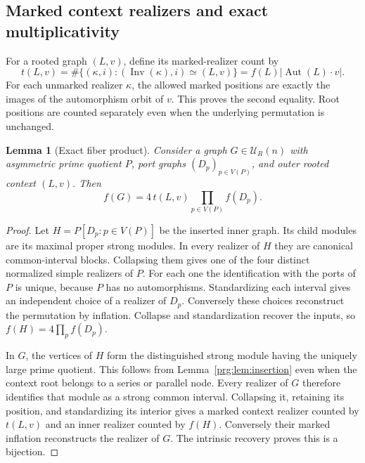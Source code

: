 \documentclass[11pt,letterpaper]{article}
\numberwithin{equation}{section}
\newtheorem{lemma}[theorem]{Lemma}
\theoremstyle{definition}\newtheorem{definition}[theorem]{Definition}
\theoremstyle{remark}\newtheorem{remark}[theorem]{Remark}
\DeclareMathOperator{\Aut}{Aut}
\DeclareMathOperator{\Inv}{Inv}
\begin{document}
\subsection{Marked context realizers and exact multiplicativity}
For a rooted graph $(L,v)$, define its marked-realizer count by
\begin{equation}\label{prg:eq:t}
 t(L,v)=\#\{(\kappa,i):(\Inv(\kappa),i)\simeq(L,v)\}
       =f(L)|\Aut(L)\cdot v|.
\end{equation}
For each unmarked realizer $\kappa$, the allowed marked positions
are exactly the images of the automorphism orbit of $v$. This
proves the second equality. Root positions are counted separately
even when the underlying permutation is unchanged.

\begin{lemma}[Exact fiber product]\label{prg:lem:fiberproduct}
Consider a graph $G\in\mathcal U_R(n)$ with asymmetric prime
quotient $P$, port graphs $(D_p)_{p\in V(P)}$, and outer rooted
context $(L,v)$. Then
\begin{equation}\label{prg:eq:fiberproduct}
 f(G)=4\,t(L,v)\prod_{p\in V(P)}f(D_p).
\end{equation}
\end{lemma}
\begin{proof}
Let $H=P[D_p:p\in V(P)]$ be the inserted inner graph. Its child
modules are its maximal proper strong modules. In every realizer
of $H$ they are canonical common-interval blocks. Collapsing them
gives one of the four distinct normalized simple realizers of $P$.
For each one the identification with the ports of $P$ is unique,
because $P$ has no automorphisms. Standardizing each interval gives
an independent choice of a realizer of $D_p$. Conversely these
choices reconstruct the permutation by inflation. Collapse and
standardization recover the inputs, so
$f(H)=4\prod_pf(D_p)$.

In $G$, the vertices of $H$ form the distinguished strong module
having the uniquely large prime quotient. This follows from
Lemma~\ref{prg:lem:insertion} even when the context root belongs to a
series or parallel node. Every realizer of $G$ therefore identifies
that module as a strong common interval. Collapsing it, retaining
its position, and standardizing its interior gives a marked context
realizer counted by $t(L,v)$ and an inner realizer counted by
$f(H)$. Conversely their marked inflation reconstructs the
realizer of $G$. The intrinsic recovery proves this is a bijection.
\end{proof}
\end{document}

